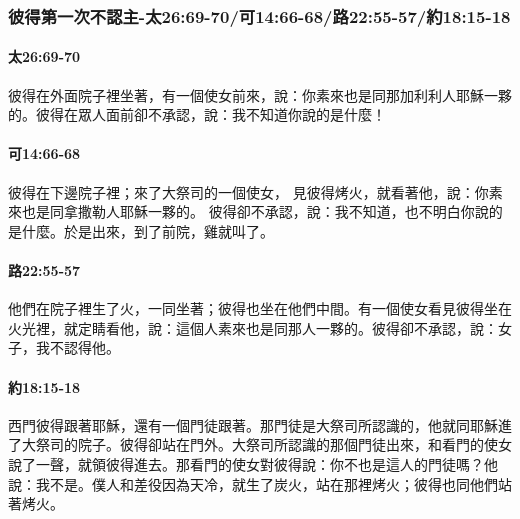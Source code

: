\subsubsection{彼得第一次不認主-太26:69-70/可14:66-68/路22:55-57/約18:15-18}
\paragraph{太26:69-70}彼得在外面院子裡坐著，有一個使女前來，說：你素來也是同那加利利人耶穌一夥的。彼得在眾人面前卻不承認，說：我不知道你說的是什麼！

\paragraph{可14:66-68}
彼得在下邊院子裡；來了大祭司的一個使女，
見彼得烤火，就看著他，說：你素來也是同拿撒勒人耶穌一夥的。
彼得卻不承認，說：我不知道，也不明白你說的是什麼。於是出來，到了前院，雞就叫了。

\paragraph{路22:55-57}
他們在院子裡生了火，一同坐著；彼得也坐在他們中間。有一個使女看見彼得坐在火光裡，就定睛看他，說：這個人素來也是同那人一夥的。彼得卻不承認，說：女子，我不認得他。


\paragraph{約18:15-18}
西門彼得跟著耶穌，還有一個門徒跟著。那門徒是大祭司所認識的，他就同耶穌進了大祭司的院子。彼得卻站在門外。大祭司所認識的那個門徒出來，和看門的使女說了一聲，就領彼得進去。那看門的使女對彼得說：你不也是這人的門徒嗎？他說：我不是。僕人和差役因為天冷，就生了炭火，站在那裡烤火；彼得也同他們站著烤火。





